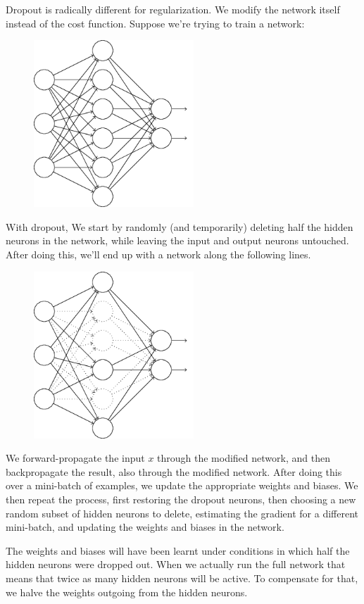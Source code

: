 \documentclass[a4paper]{tufte-handout}
\begin{document}
Dropout is radically different for regularization. We modify the network
itself instead of the cost function. Suppose we're trying to train a
network:

\begin{figure}
\includegraphics[width=60mm]{dropout1.png}
\end{figure}


With dropout, We start by randomly (and temporarily) deleting half the
hidden neurons in the network, while leaving the input and output
neurons untouched. After doing this, we'll end up with a network along
the following lines.


\begin{figure}
\includegraphics[width=60mm]{dropout2.png}
\end{figure}


We forward-propagate the input \(x\) through the modified network, and
then backpropagate the result, also through the modified network. After
doing this over a mini-batch of examples, we update the appropriate
weights and biases. We then repeat the process, first restoring the
dropout neurons, then choosing a new random subset of hidden neurons to
delete, estimating the gradient for a different mini-batch, and updating
the weights and biases in the network.

The weights and biases will have been learnt under conditions in which
half the hidden neurons were dropped out. When we actually run the full
network that means that twice as many hidden neurons will be active. To
compensate for that, we halve the weights outgoing from the hidden
neurons.
\end{document}
